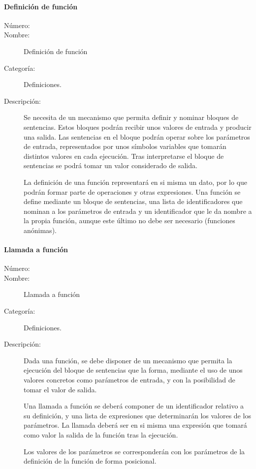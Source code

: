 \paragraph{Definición de función}
\begin{framed}
	\begin{description}
		\item [Número:] \cn
		\item [Nombre:] Definición de función
		\item [Categoría:] Definiciones.
		\item [Descripción:] Se necesita de un mecanismo que permita definir y nominar bloques de sentencias. Estos bloques podrán recibir unos valores
		de entrada y producir una salida. Las sentencias en el bloque podrán operar sobre los parámetros de entrada, representados por
		unos símbolos variables que tomarán distintos valores en cada ejecución. Tras interpretarse el bloque 
		de sentencias se podrá tomar un valor considerado de salida. 
		
		La definición de una función representará en si misma un dato, por lo que podrán formar parte de operaciones 
		y otras expresiones. 
		Una función se define mediante un bloque de sentencias, una lista de identificadores que nominan a los parámetros de entrada y un 
		identificador que le da nombre a la propia función, aunque este último no debe ser necesario (funciones anónimas). 
		
	\end{description}
\end{framed}

\paragraph{Llamada a función}
\begin{framed}
	\begin{description}
		\item [Número:] \cn
		\item [Nombre:] Llamada a función
		\item [Categoría:] Definiciones.
		\item [Descripción:] Dada una función, se debe disponer de un mecanismo que permita la ejecución del bloque de 
		sentencias que la forma, mediante el uso de unos valores concretos como parámetros de entrada, y con la posibilidad de tomar 
		el valor de salida.
		
		Una llamada a función se deberá componer de un identificador relativo a su definición, y una lista de expresiones
		que determinarán los valores de los parámetros. La llamada deberá ser en si misma una expresión 
		que tomará como valor la salida de la función tras la ejecución.
		
		Los valores de los parámetros se corresponderán con los parámetros de la definición de la función de forma posicional.
	\end{description}
\end{framed}

